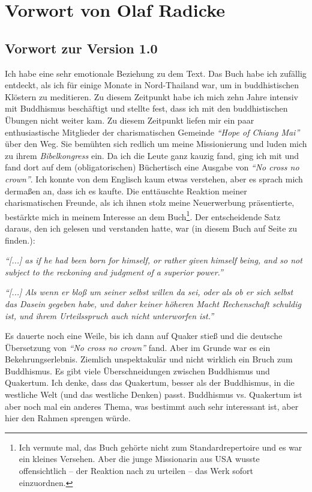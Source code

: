 \part{Vorwort von Olaf Radicke}

\chapter{Vorwort zur Version 1.0}
Ich habe eine sehr emotionale Beziehung zu dem Text. Das Buch habe ich zufällig
entdeckt, als ich für einige Monate in Nord-Thailand war, um in
buddhistischen Klöstern zu meditieren. Zu diesem Zeitpunkt habe 
ich mich zehn Jahre intensiv mit Buddhismus beschäftigt und stellte fest, dass ich mit den buddhistischen Übungen
nicht weiter kam. Zu diesem Zeitpunkt liefen mir ein paar enthusiastische
Mitglieder der charismatischen Gemeinde \textit{"`Hope of Chiang Mai"'} über
den Weg. Sie bemühten sich redlich um meine Missionierung und luden mich zu
ihrem \textit{Bibelkongress} ein. Da ich die Leute ganz kauzig fand, ging ich
mit und fand dort auf dem (obligatorischen) Büchertisch eine Ausgabe
von \textit{"`No cross no crown"'}.
Ich konnte von dem Englisch kaum etwas verstehen, aber es sprach mich dermaßen
an, dass ich es kaufte. Die enttäuschte Reaktion meiner charismatischen Freunde,
als ich ihnen stolz meine Neuerwerbung präsentierte, bestärkte mich in meinem
Interesse an dem Buch\footnote{Ich vermute mal, das Buch gehörte nicht zum
Standardrepertoire und es war ein kleines Versehen. Aber die junge Missionarin
aus USA wusste offensichtlich -- der Reaktion nach zu urteilen -- das Werk
sofort einzuordnen.}. Der entscheidende Satz daraus, den ich gelesen und
verstanden hatte, war (in diesem Buch auf
Seite \pageref{ref:vorw_sinndes_lebens} zu finden.):

\begin{center}
\parbox{7,5cm}{
\textit{"`[...] as if he had been born for himself, or rather given himself being,
and so not subject to the reckoning and judgment of a superior power."'}

\medskip

\textit{"`[...] Als wenn er bloß um seiner selbst willen da sei, oder als ob er
sich selbst das Dasein gegeben habe, und daher keiner höheren Macht Rechenschaft
schuldig ist, und ihrem Urteilsspruch auch nicht unterworfen ist."'}
}
\end{center}

\medskip

Es dauerte noch eine Weile, bis ich dann auf Quaker stieß und die deutsche
Übersetzung von \textit{"`No cross no crown"'} fand. Aber im Grunde war es ein
Bekehrungserlebnis. Ziemlich unspektakulär und nicht wirklich ein Bruch zum
Buddhismus. Es gibt viele Überschneidungen zwischen Buddhismus und Quakertum.
Ich denke, dass das Quakertum, besser als der Buddhismus, in die westliche Welt
(und das westliche
Denken) passt. Buddhismus vs. Quakertum ist aber noch mal
ein anderes Thema, was bestimmt auch sehr interessant ist, aber hier den Rahmen
sprengen würde.

